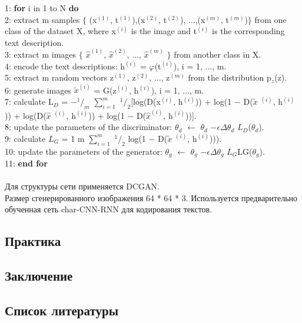 \documentclass{article}
\begin{document}
    1: \textbf {for} i in 1 to N \textbf {do}\\
    2: \indent extract m samples $\{$ (x$^(1)$, t$^{(1)}$),(x$^{(2)}$, t$^{(2)}$), ...,(x$^{(m)}$, t$^{(m)}$)$\}$ from one class of the dataset X, where x$^{(i)}$ is the image and t$^{(i)}$ is the corresponding text description.\\
    3: \indent extract m images $\{$ $\hat{x}^{(1)}$, $\hat{x}^{(2)}$, ..., $\hat{x}^{(m)}$ $\}$ from another class in X.\\
    4: \indent encode the text descriptions: h$^{(i)}$ = $\varphi$(t$^{(i)}$), i = 1, ..., m.\\
    5: \indent extract m random vectors {z$^{(1)}$, z$^{(2)}$, ..., z$^{(m)}$} from the distribution p$_z$(z).\\
    6: \indent generate images $\widetilde{x}^{(i)}$ = G(z$^{(i)}$, h$^{(i)}$), i = 1, ..., m.\\
    7: \indent calculate L$_D$ = −$^1/_m$ $\sum_{i=1}^{m}$ $^1/_2$[log(D(x$^{(i)}$, h$^{(i)}$)) + log(1 − D($\widetilde{x}$ $^{(i)}$, h$^{(i)}$)) + log(D($\hat{x}$ $^{(i)}$, h$^{(i)}$)) + log(1 − D($\hat{x}^{(i)}$, h$^{(i)}$))].\\
    8: \indent update the parameters of the discriminator: $\theta _{d}$ $\leftarrow$ $\theta _{d}$ $- \epsilon \Delta$$\theta _{d}$ $L_{D}$($\theta _{d}$).\\
    9: \indent calculate $L_{G}$ = 1 m $\sum_{i=1}^{m}$ $^1/_2$ log(1 − D($\widetilde{x}$ $^{(i)}$, h$^{(i)}$))).\\
    10: \indent update the parameters of the generator: $\theta _{g}$ $\leftarrow$ $\theta _{g}$ $ - \epsilon \Delta$$\theta _{g}$ $L_{G}$LG($\theta _{g}$).\\
    11: \textbf {end for}
    \\ \\ 
    Для структуры сети применяется DCGAN. \\
    Размер сгенерированного изображения 64 * 64 * 3. Используется предварительно обученная сеть char-CNN-RNN для кодирования текстов.
    
    \newpage
    \begin{center} 
    \section{Практика}
    \end{center} 
    
    \newpage
    \begin{center} 
    \section{Заключение}
    \end{center} 
    
    \newpage
    \begin{center} 
    \section{Список литературы}
    \end{center} 
    
\end{document}
